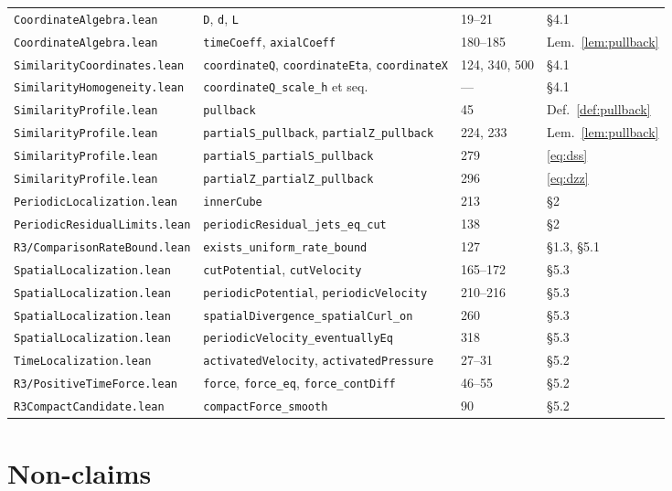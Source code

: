 \documentclass[11pt]{article}
\newcommand{\ct}[1]{\texttt{#1}}
\newcommand{\file}[1]{\texttt{\small #1}}
\theoremstyle{plain}
\theoremstyle{definition}
\theoremstyle{remark}
\begin{document}
\begin{center}
\begin{tabular}{@{}llll@{}}
\file{CoordinateAlgebra.lean} & \ct{D}, \ct{d}, \ct{L} & 19--21 & \S4.1 \\
\file{CoordinateAlgebra.lean} & \ct{timeCoeff}, \ct{axialCoeff} & 180--185 & Lem.~\ref{lem:pullback} \\
\file{SimilarityCoordinates.lean} & \ct{coordinateQ}, \ct{coordinateEta}, \ct{coordinateX} & 124, 340, 500 & \S4.1 \\
\file{SimilarityHomogeneity.lean} & \ct{coordinateQ\_scale\_h} et seq. & --- & \S4.1 \\
\file{SimilarityProfile.lean} & \ct{pullback} & 45 & Def.~\ref{def:pullback} \\
\file{SimilarityProfile.lean} & \ct{partialS\_pullback}, \ct{partialZ\_pullback} & 224, 233 & Lem.~\ref{lem:pullback} \\
\file{SimilarityProfile.lean} & \ct{partialS\_partialS\_pullback} & 279 & \eqref{eq:dss} \\
\file{SimilarityProfile.lean} & \ct{partialZ\_partialZ\_pullback} & 296 & \eqref{eq:dzz} \\
\file{PeriodicLocalization.lean} & \ct{innerCube} & 213 & \S2 \\
\file{PeriodicResidualLimits.lean} & \ct{periodicResidual\_jets\_eq\_cut} & 138 & \S2 \\
\file{R3/ComparisonRateBound.lean} & \ct{exists\_uniform\_rate\_bound} & 127 & \S1.3, \S5.1 \\
\file{SpatialLocalization.lean} & \ct{cutPotential}, \ct{cutVelocity} & 165--172 & \S5.3 \\
\file{SpatialLocalization.lean} & \ct{periodicPotential}, \ct{periodicVelocity} & 210--216 & \S5.3 \\
\file{SpatialLocalization.lean} & \ct{spatialDivergence\_spatialCurl\_on} & 260 & \S5.3 \\
\file{SpatialLocalization.lean} & \ct{periodicVelocity\_eventuallyEq} & 318 & \S5.3 \\
\file{TimeLocalization.lean} & \ct{activatedVelocity}, \ct{activatedPressure} & 27--31 & \S5.2 \\
\file{R3/PositiveTimeForce.lean} & \ct{force}, \ct{force\_eq}, \ct{force\_contDiff} & 46--55 & \S5.2 \\
\file{R3CompactCandidate.lean} & \ct{compactForce\_smooth} & 90 & \S5.2 \\
\bottomrule
\end{tabular}
\end{center}

\section{Non-claims}
\end{document}
